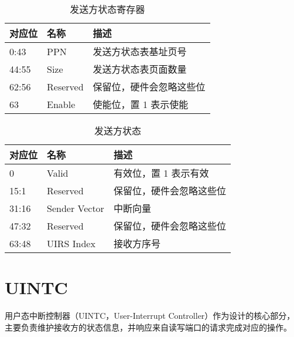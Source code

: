\begin{table}
    \centering
    \begin{threeparttable}[c]
        \label{tab:three-part-table-1}
        \begin{tabular}{|l|l|l|}
            \hline
            对应位 & 名称 & 描述 \\
            \hline
            0:43 & PPN & 发送方状态表基址页号 \\
            \hline
            44:55 & Size & 发送方状态表页面数量 \\
            \hline
            62:56 & Reserved & 保留位，硬件会忽略这些位 \\
            \hline
            63 & Enable & 使能位，置 1 表示使能 \\
            \hline
        \end{tabular}
        \caption{发送方状态寄存器}
    \end{threeparttable}
\end{table}

\begin{table}
    \centering
    \begin{threeparttable}[c]
        \label{tab:three-part-table-2}
        \begin{tabular}{|l|l|l|}
            \hline
            对应位 & 名称 & 描述 \\
            \hline
            0 & Valid & 有效位，置 1 表示有效 \\
            \hline
            15:1 & Reserved & 保留位，硬件会忽略这些位 \\
            \hline
            31:16 & Sender Vector & 中断向量 \\
            \hline
            47:32 & Reserved & 保留位，硬件会忽略这些位 \\
            \hline
            63:48 & UIRS Index & 接收方序号 \\
            \hline
        \end{tabular}
        \caption{发送方状态}
    \end{threeparttable}
\end{table}

\newpage

\section{UINTC}

用户态中断控制器（UINTC，User-Interrupt Controller）作为设计的核心部分，主要负责维护接收方的状态信息，并响应来自读写端口的请求完成对应的操作。

